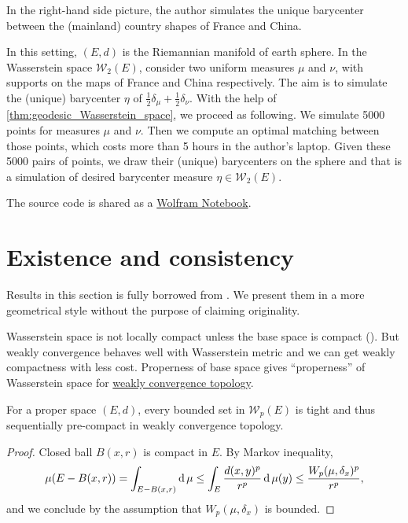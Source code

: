 In the right-hand side picture,
the author simulates the unique barycenter between the (mainland) country shapes of France and China.

\begin{example}
	\label{example:barycenter_sphere}
	In this setting, $(E, d)$ is the Riemannian manifold of earth sphere.
	In the Wasserstein space $\mathcal{W}_2(E)$, consider two uniform measures $\mu$ and $\nu$,
	with supports on the maps of France and China respectively.
	The aim is to simulate the (unique) barycenter $\eta$ of $\frac{1}{2}\delta_\mu + \frac{1}{2}\delta_\nu$.
	With the help of \cref{thm:geodesic_Wasserstein_space}, we proceed as following.
	We simulate 5000 points for measures $\mu$ and $\nu$.
	Then we compute an optimal matching between those points,
	which costs more than 5 hours in the author's laptop.
	Given these 5000 pairs of points,
	we draw their (unique) barycenters on the sphere and that is a simulation of desired barycenter measure $\eta \in \mathcal{W}_2(E)$.
\end{example}

The source code is shared as a \href{https://www.wolframcloud.com/obj/jingmatrix/Published/OPT_sphere_country.nb}{Wolfram Notebook}.

\section{Existence and consistency}

Results in this section is fully borrowed from \cite{le2017existence}.
We present them in a more geometrical style without the purpose of claiming originality.

Wasserstein space is not locally compact unless the base space is compact (\cite[Remark 7.1.9]{Ambrosio2005}).
But weakly convergence behaves well with Wasserstein metric and we can get weakly compactness with less cost.
Properness of base space gives ``properness'' of Wasserstein space for \underline{weakly convergence topology}.

\begin{prop}
	\label{prop:proper_weakly_convergence_topology}
	For a proper space $(E,d)$,
	every bounded set in $\mathcal{W}_p(E)$ is tight and thus
	sequentially	pre-compact in weakly convergence topology.
\end{prop}

\begin{proof}
	Closed ball $B(x,r)$ is compact in $E$.
	By Markov inequality,
	\[
		\mu(E - B(x,r)) = \int_{E - B(x,r)} \operatorname{d} \mu \leq
		\int_{E} \frac{d(x, y)^p}{r^p} \operatorname{d} \mu(y) \leq  \frac{W_p(\mu, \delta_x)^p}{r^p},
	\]
	and we conclude by the assumption that $W_p( \mu, \delta_x)$ is bounded.
\end{proof}

